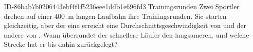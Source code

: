 \begin{exercise}
      {ID-86bab7b0206443ebf4f1f5236eee1ddb1e696fd3}
      {Trainingsrunden}
  \ifproblem\problem
    Zwei Sportler drehen auf einer \SI{400}{\metre} langen Laufbahn ihre
    Trainingsrunden. Sie starten gleichzeitig, aber der eine erreicht eine
    Durchschnittsgeschwindigkeit von  und der andere von .
    Wann überrundet der schnellere Läufer den langsameren, und welche
    Strecke hat er bis dahin zurückgelegt?
  \fi
\end{exercise}
